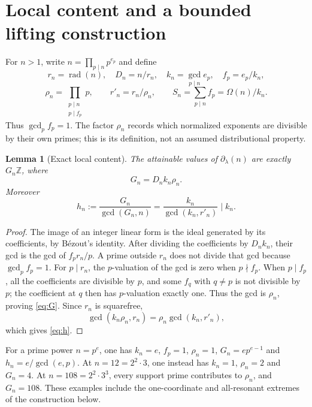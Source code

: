 \documentclass[11pt]{article}
\newtheorem{lemma}[theorem]{Lemma}
\theoremstyle{definition}
\theoremstyle{remark}
\DeclareMathOperator{\rad}{rad}
\newcommand{\Z}{\mathbb Z}
\newcommand{\Om}{\Omega}
\begin{document}
\section{Local content and a bounded lifting construction}\label{sec:local}
For $n>1$, write $n=\prod_{p\mid n}p^{e_p}$ and define
\[
 r_n=\rad(n),\quad D_n=n/r_n,\quad
 k_n=\gcd_{p\mid n}e_p,\quad f_p=e_p/k_n,
\]
\begin{equation}\label{eq:rho}
 \rho_n=\prod_{\substack{p\mid n\\p\mid f_p}}p,
 \qquad r'_n=r_n/\rho_n,\qquad S_n=\sum_{p\mid n}f_p=\Om(n)/k_n.
\end{equation}
Thus $\gcd_p f_p=1$. The factor $\rho_n$ records which normalized exponents are divisible by their own primes; this is its definition, not an assumed distributional property.

\begin{lemma}[Exact local content]\label{lem:content}
The attainable values of $\partial_\lambda(n)$ are exactly $G_n\Z$, where
\begin{equation}\label{eq:G}
 G_n=D_n k_n\rho_n.
\end{equation}
Moreover
\begin{equation}\label{eq:h}
 h_n:=\frac{G_n}{\gcd(G_n,n)}
 =\frac{k_n}{\gcd(k_n,r'_n)}\mid k_n.
\end{equation}
\end{lemma}
\begin{proof}
The image of an integer linear form is the ideal generated by its coefficients, by B\'ezout's identity. After dividing the coefficients by $D_nk_n$, their gcd is the gcd of $f_p r_n/p$. A prime outside $r_n$ does not divide that gcd because $\gcd_p f_p=1$. For $p\mid r_n$, the $p$-valuation of the gcd is zero when $p\nmid f_p$. When $p\mid f_p$, all the coefficients are divisible by $p$, and some $f_q$ with $q\ne p$ is not divisible by $p$; the coefficient at $q$ then has $p$-valuation exactly one. Thus the gcd is $\rho_n$, proving \eqref{eq:G}. Since $r_n$ is squarefree,
\[
 \gcd(k_n\rho_n,r_n)=\rho_n\gcd(k_n,r'_n),
\]
which gives \eqref{eq:h}.
\end{proof}
For a prime power $n=p^e$, one has $k_n=e$, $f_p=1$, $\rho_n=1$, $G_n=ep^{e-1}$ and $h_n=e/\gcd(e,p)$. At $n=12=2^2\cdot3$, one instead has $k_n=1$, $\rho_n=2$ and $G_n=4$. At $n=108=2^2\cdot3^3$, every support prime contributes to $\rho_n$, and $G_n=108$. These examples include the one-coordinate and all-resonant extremes of the construction below.
\end{document}
